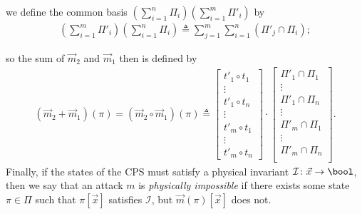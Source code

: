 {\begin{definition}[Attack]
we define the common basis $(\sum_{i=1}^n\Pi_i)(\sum_{i=1}^m\Pi'_i)$ by 
\begin{align}
  \left(\sum_{i=1}^m\Pi'_i\right)\left(\sum_{i=1}^n\Pi_i\right)\triangleq \sum_{j=1}^m\sum_{i=1}^n(\Pi'_j\cap\Pi_i);
\end{align}

so the sum of $\vec{m}_2$ and $\vec{m}_1$ then is defined by
\begin{align}
  (\vec{m}_2+\vec{m}_1)(\pi)=(\vec{m}_2\circ\vec{m}_1)(\pi)\triangleq
  \begin{bmatrix}
    t'_{1}\circ t_1 \\
    \vdots \\
    t'_{1}\circ t_n\\
    \vdots \\
    t'_{m}\circ t_1 \\
    \vdots \\
    t'_{m}\circ t_n
  \end{bmatrix}
  \cdot
  \begin{bmatrix}
    \Pi'_{1}\cap\Pi_{1} \\
    \vdots \\
    \Pi'_{1}\cap\Pi_{n}\\
    \vdots \\
    \Pi'_{m}\cap\Pi_{1} \\
    \vdots \\
    \Pi'_{m}\cap\Pi_{n}\\
  \end{bmatrix}.
\end{align} 
Finally, if the states of the CPS must satisfy a physical invariant $\mathcal{I}\colon \vec{x}\rightarrow\bool$, then we say that an attack $m$ is \emph{physically impossible} if there exists some state $\pi\in \Pi$ such that $\pi[\vec{x}]$ satisfies $\mathcal{I}$, but $\vec{m}(\pi)[\vec{x}]$ does not.
\end{definition}

}
